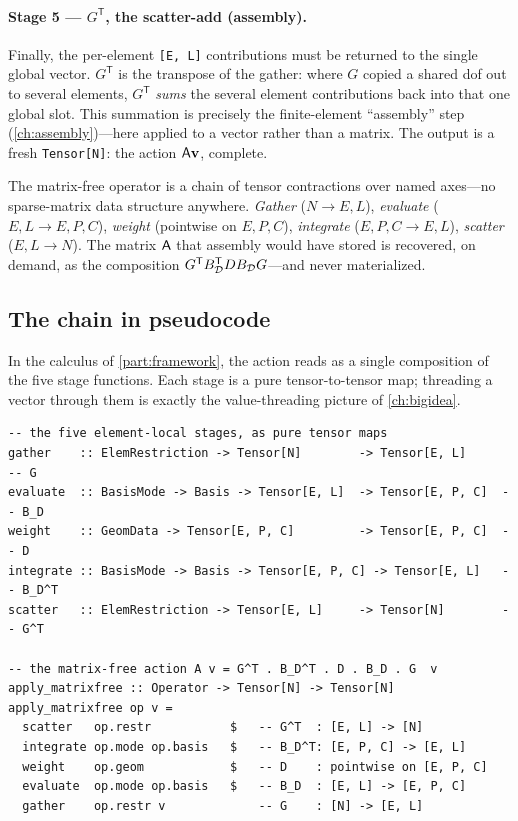 \paragraph{Stage 5 --- $G^{\mathsf T}$, the scatter-add (assembly).}
Finally, the per-element \lstinline[style=l4style]|[E, L]| contributions must be
returned to the single global vector. $G^{\mathsf T}$ is the transpose of the
gather: where $G$ copied a shared dof out to several elements, $G^{\mathsf T}$
\emph{sums} the several element contributions back into that one global slot.
This summation is precisely the finite-element ``assembly'' step
(\cref{ch:assembly})---here applied to a vector rather than a matrix. The output
is a fresh \lstinline[style=l4style]|Tensor[N]|: the action $\mathsf{A}\mathbf{v}$, complete.

\begin{keyidea}
The matrix-free operator is a chain of tensor contractions over named axes---no
sparse-matrix data structure anywhere. \emph{Gather} ($N\!\to\!E,L$),
\emph{evaluate} ($E,L\!\to\!E,P,C$), \emph{weight} (pointwise on $E,P,C$),
\emph{integrate} ($E,P,C\!\to\!E,L$), \emph{scatter} ($E,L\!\to\!N$). The matrix
$\mathsf{A}$ that assembly would have stored is recovered, on demand, as the
composition $G^{\mathsf T}B_{\mathcal{D}}^{\mathsf T}DB_{\mathcal{D}}G$---and never
materialized.
\end{keyidea}

\subsection{The chain in pseudocode}
\label{sec:mf-pseudo}

In the calculus of \cref{part:framework}, the action reads as a single
composition of the five stage functions. Each stage is a pure tensor-to-tensor
map; threading a vector through them is exactly the value-threading picture of
\cref{ch:bigidea}.

\begin{lstlisting}[style=l4style]
-- the five element-local stages, as pure tensor maps
gather    :: ElemRestriction -> Tensor[N]        -> Tensor[E, L]      -- G
evaluate  :: BasisMode -> Basis -> Tensor[E, L]  -> Tensor[E, P, C]  -- B_D
weight    :: GeomData -> Tensor[E, P, C]         -> Tensor[E, P, C]  -- D
integrate :: BasisMode -> Basis -> Tensor[E, P, C] -> Tensor[E, L]   -- B_D^T
scatter   :: ElemRestriction -> Tensor[E, L]     -> Tensor[N]        -- G^T

-- the matrix-free action A v = G^T . B_D^T . D . B_D . G  v
apply_matrixfree :: Operator -> Tensor[N] -> Tensor[N]
apply_matrixfree op v =
  scatter   op.restr           $   -- G^T  : [E, L] -> [N]
  integrate op.mode op.basis   $   -- B_D^T: [E, P, C] -> [E, L]
  weight    op.geom            $   -- D    : pointwise on [E, P, C]
  evaluate  op.mode op.basis   $   -- B_D  : [E, L] -> [E, P, C]
  gather    op.restr v             -- G    : [N] -> [E, L]
\end{lstlisting}

